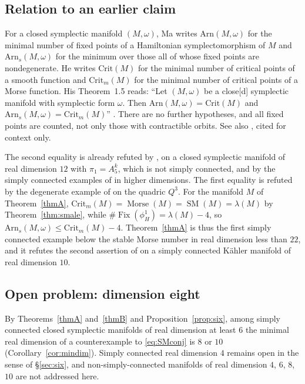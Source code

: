 \documentclass[11pt]{amsart}
\numberwithin{equation}{section}
\theoremstyle{definition}
\theoremstyle{remark}
\DeclareMathOperator{\SM}{SM}
\DeclareMathOperator{\Morse}{Morse}
\DeclareMathOperator{\Fix}{Fix}
\begin{document}
\subsection{Relation to an earlier claim}\label{subsec:Ma}

For a closed symplectic manifold $(M,\omega)$, Ma \cite{Ma2013} writes
$\mathrm{Arn}(M,\omega)$ for the minimal number of fixed points of a
Hamiltonian symplectomorphism of $M$ and $\mathrm{Arn}_s(M,\omega)$ for
the minimum over those all of whose fixed points are nondegenerate. He
writes $\mathrm{Crit}(M)$ for the minimal number of critical points of a
smooth function and $\mathrm{Crit}_m(M)$ for the minimal number of
critical points of a Morse function. His Theorem~1.5 reads: ``Let
$(M,\omega)$ be a close[d] symplectic manifold with symplectic form
$\omega$. Then $\mathrm{Arn}(M,\omega)=\mathrm{Crit}(M)$ and
$\mathrm{Arn}_s(M,\omega)=\mathrm{Crit}_m(M)$'' \cite[Thm.~1.5]{Ma2013}.
There are no further hypotheses, and all fixed points are counted, not
only those with contractible orbits. See also \cite{VibeMathed}, cited for
context only.

The second equality is already refuted by \cite[Thm.~1.1]{OpenAISept23},
on a closed symplectic manifold of real dimension $12$ with $\pi_1=A_5^k$,
which is not simply connected, and by the simply connected examples of
\cite{OpenAIStable,OpenAI22,OpenAICompanion} in higher dimensions. The
first equality is refuted by the degenerate example of
\cite{OpenAIDegenerate} on the quadric $Q^3$. For the manifold $M$ of
Theorem~\ref{thmA}, $\mathrm{Crit}_m(M)=\Morse(M)=\SM(M)=\lambda(M)$ by
Theorem~\ref{thm:smale}, while $\#\Fix(\phi_H^1)=\lambda(M)-4$, so
$\mathrm{Arn}_s(M,\omega)\le\mathrm{Crit}_m(M)-4$. Theorem~\ref{thmA} is
thus the first simply connected example below the stable Morse number in
real dimension less than $22$, and it refutes the second assertion of
\cite[Thm.~1.5]{Ma2013} on a simply connected K\"ahler manifold of real
dimension $10$.

\subsection{Open problem: dimension eight}

By Theorems~\ref{thmA} and~\ref{thmB} and Proposition~\ref{prop:six}, among
simply connected closed symplectic manifolds of real dimension at least
$6$ the minimal real dimension of a counterexample to \eqref{eq:SMconj}
is $8$ or $10$ (Corollary~\ref{cor:mindim}). Simply connected real
dimension $4$ remains open in the sense of \S\ref{sec:six}, and
non-simply-connected manifolds of real dimension $4$, $6$, $8$, $10$ are
not addressed here.
\end{document}
